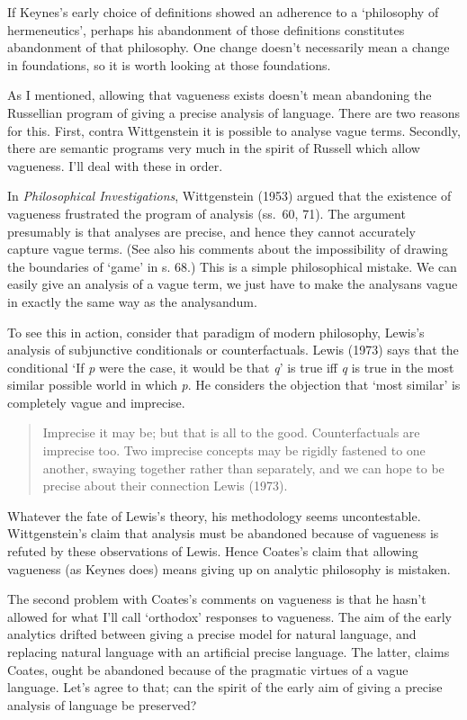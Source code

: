 \documentclass[noflushend]{philosophersimprint}
\begin{document}
If Keynes's early choice of definitions showed an adherence to a
`philosophy of hermeneutics', perhaps his abandonment of those
definitions constitutes abandonment of that philosophy. One change
doesn't necessarily mean a change in foundations, so it is worth looking
at those foundations.

As I mentioned, allowing that vagueness exists doesn't mean abandoning
the Russellian program of giving a precise analysis of language. There
are two reasons for this. First, contra Wittgenstein it is possible to
analyse vague terms. Secondly, there are semantic programs very much in
the spirit of Russell which allow vagueness. I'll deal with these in
order.

In \emph{Philosophical Investigations}, Wittgenstein (1953) argued that
the existence of vagueness frustrated the program of analysis (ss.~60,
71). The argument presumably is that analyses are precise, and hence
they cannot accurately capture vague terms. (See also his comments about
the impossibility of drawing the boundaries of `game' in s. 68.) This is
a simple philosophical mistake. We can easily give an analysis of a
vague term, we just have to make the analysans vague in exactly the same
way as the analysandum.

To see this in action, consider that paradigm of modern philosophy,
Lewis's analysis of subjunctive conditionals or counterfactuals. Lewis
(1973) says that the conditional `If \emph{p} were the case, it would be
that \emph{q}' is true iff \emph{q} is true in the most similar possible
world in which \emph{p}. He considers the objection that `most similar'
is completely vague and imprecise.

\begin{quote}
Imprecise it may be; but that is all to the good. Counterfactuals are
imprecise too. Two imprecise concepts may be rigidly fastened to one
another, swaying together rather than separately, and we can hope to be
precise about their connection Lewis (1973).
\end{quote}

Whatever the fate of Lewis's theory, his methodology seems
uncontestable. Wittgenstein's claim that analysis must be abandoned
because of vagueness is refuted by these observations of Lewis. Hence
Coates's claim that allowing vagueness (as Keynes does) means giving up
on analytic philosophy is mistaken.

The second problem with Coates's comments on vagueness is that he hasn't
allowed for what I'll call `orthodox' responses to vagueness. The aim of
the early analytics drifted between giving a precise model for natural
language, and replacing natural language with an artificial precise
language. The latter, claims Coates, ought be abandoned because of the
pragmatic virtues of a vague language. Let's agree to that; can the
spirit of the early aim of giving a precise analysis of language be
preserved?
\end{document}
